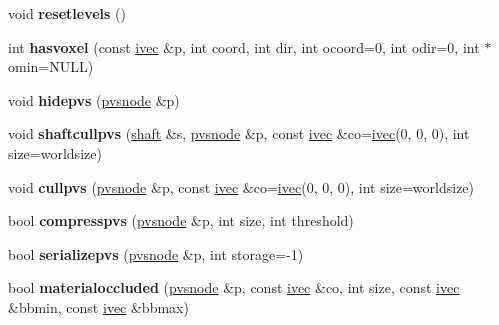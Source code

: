 \begin{DoxyCompactItemize}
\item 
\mbox{\label{structpvsworker_afee4a76f12314aab22bf1c8624c12ac5}} 
void {\bfseries resetlevels} ()
\item 
\mbox{\label{structpvsworker_a4fadb048197fd058f9ecfd1c7835e0d7}} 
int {\bfseries hasvoxel} (const \hyperlink{structivec}{ivec} \&p, int coord, int dir, int ocoord=0, int odir=0, int $\ast$omin=N\+U\+LL)
\item 
\mbox{\label{structpvsworker_a4a0c56bf1bf3e29c19ca3ecbde1c6887}} 
void {\bfseries hidepvs} (\hyperlink{structpvsnode}{pvsnode} \&p)
\item 
\mbox{\label{structpvsworker_a5c4b5eda21cf9bf5aeafdbe4d56521a6}} 
void {\bfseries shaftcullpvs} (\hyperlink{structshaft}{shaft} \&s, \hyperlink{structpvsnode}{pvsnode} \&p, const \hyperlink{structivec}{ivec} \&co=\hyperlink{structivec}{ivec}(0, 0, 0), int size=worldsize)
\item 
\mbox{\label{structpvsworker_ae2c24a805853f1024668dcc140a522f3}} 
void {\bfseries cullpvs} (\hyperlink{structpvsnode}{pvsnode} \&p, const \hyperlink{structivec}{ivec} \&co=\hyperlink{structivec}{ivec}(0, 0, 0), int size=worldsize)
\item 
\mbox{\label{structpvsworker_a5c3cf458a0492defaa1844928f76f49a}} 
bool {\bfseries compresspvs} (\hyperlink{structpvsnode}{pvsnode} \&p, int size, int threshold)
\item 
\mbox{\label{structpvsworker_ad5317d04a183441d5cbb690996ca7dd8}} 
bool {\bfseries serializepvs} (\hyperlink{structpvsnode}{pvsnode} \&p, int storage=-\/1)
\item 
\mbox{\label{structpvsworker_afa9415995053b7161a62f5c639cb8562}} 
bool {\bfseries materialoccluded} (\hyperlink{structpvsnode}{pvsnode} \&p, const \hyperlink{structivec}{ivec} \&co, int size, const \hyperlink{structivec}{ivec} \&bbmin, const \hyperlink{structivec}{ivec} \&bbmax)
\item 
\mbox{\label{structpvsworker_a52c05e646dc9c9f5e40ed528db7ee211}} 

\end{DoxyCompactItemize}
